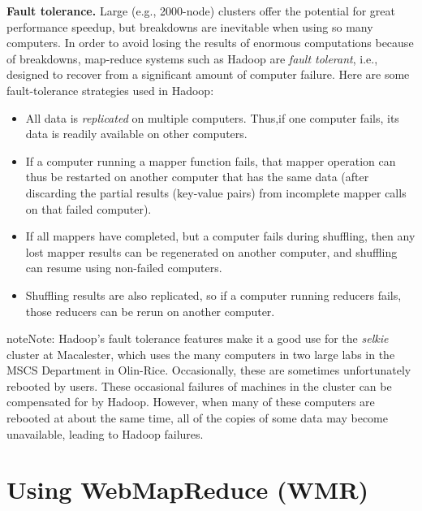 \documentclass[letterpaper,10pt,openany,oneside]{sphinxmanual}
\begin{document}
\textbf{Fault tolerance.} Large (e.g., 2000-node) clusters offer the
potential for great performance speedup, but breakdowns are
inevitable when using so many computers. In order to avoid losing
the results of enormous computations because of breakdowns,
map-reduce systems such as Hadoop are \emph{fault tolerant}, i.e.,
designed to recover from a significant amount of computer failure.
Here are some fault-tolerance strategies used in Hadoop:
\begin{itemize}
\item {} 
All data is \emph{replicated} on multiple computers. Thus,if one
computer fails, its data is readily available on other computers.

\item {} 
If a computer running a mapper function fails, that mapper
operation can thus be restarted on another computer that has the
same data (after discarding the partial results (key-value pairs)
from incomplete mapper calls on that failed computer).

\item {} 
If all mappers have completed, but a computer fails during
shuffling, then any lost mapper results can be regenerated on
another computer, and shuffling can resume using non-failed
computers.

\item {} 
Shuffling results are also replicated, so if a computer running
reducers fails, those reducers can be rerun on another computer.

\end{itemize}

\begin{notice}{note}{Note:}
Hadoop's fault tolerance features make it a good use for
the \emph{selkie} cluster at Macalester, which uses the many computers
in two large labs in the MSCS Department in Olin-Rice.
Occasionally, these are sometimes unfortunately rebooted by users.
These occasional failures of machines in the cluster can be
compensated for by Hadoop. However, when many of these computers
are rebooted at about the same time, all of the copies of some data
may become unavailable, leading to Hadoop failures.
\end{notice}


\chapter{Using WebMapReduce (WMR)}
\label{wmr_py/wmr_py:using-webmapreduce-wmr}\label{wmr_py/wmr_py::doc}
\end{document}
